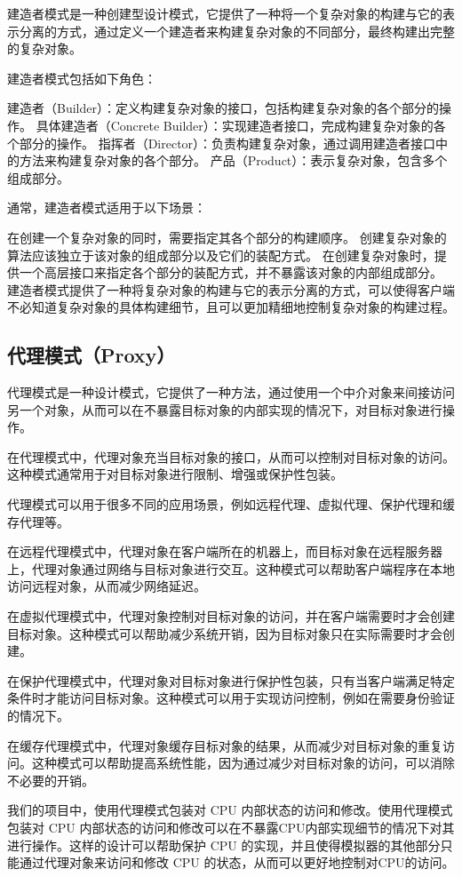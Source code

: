 \documentclass[cn,black,12pt,normal]{elegantnote}
\begin{document}
建造者模式是一种创建型设计模式，它提供了一种将一个复杂对象的构建与它的表示分离的方式，通过定义一个建造者来构建复杂对象的不同部分，最终构建出完整的复杂对象。

建造者模式包括如下角色：

建造者（Builder）：定义构建复杂对象的接口，包括构建复杂对象的各个部分的操作。
具体建造者（Concrete Builder）：实现建造者接口，完成构建复杂对象的各个部分的操作。
指挥者（Director）：负责构建复杂对象，通过调用建造者接口中的方法来构建复杂对象的各个部分。
产品（Product）：表示复杂对象，包含多个组成部分。

通常，建造者模式适用于以下场景：

在创建一个复杂对象的同时，需要指定其各个部分的构建顺序。
创建复杂对象的算法应该独立于该对象的组成部分以及它们的装配方式。
在创建复杂对象时，提供一个高层接口来指定各个部分的装配方式，并不暴露该对象的内部组成部分。
建造者模式提供了一种将复杂对象的构建与它的表示分离的方式，可以使得客户端不必知道复杂对象的具体构建细节，且可以更加精细地控制复杂对象的构建过程。


\subsection{代理模式（Proxy）}

代理模式是一种设计模式，它提供了一种方法，通过使用一个中介对象来间接访问另一个对象，从而可以在不暴露目标对象的内部实现的情况下，对目标对象进行操作。

在代理模式中，代理对象充当目标对象的接口，从而可以控制对目标对象的访问。这种模式通常用于对目标对象进行限制、增强或保护性包装。

代理模式可以用于很多不同的应用场景，例如远程代理、虚拟代理、保护代理和缓存代理等。

在远程代理模式中，代理对象在客户端所在的机器上，而目标对象在远程服务器上，代理对象通过网络与目标对象进行交互。这种模式可以帮助客户端程序在本地访问远程对象，从而减少网络延迟。

在虚拟代理模式中，代理对象控制对目标对象的访问，并在客户端需要时才会创建目标对象。这种模式可以帮助减少系统开销，因为目标对象只在实际需要时才会创建。

在保护代理模式中，代理对象对目标对象进行保护性包装，只有当客户端满足特定条件时才能访问目标对象。这种模式可以用于实现访问控制，例如在需要身份验证的情况下。

在缓存代理模式中，代理对象缓存目标对象的结果，从而减少对目标对象的重复访问。这种模式可以帮助提高系统性能，因为通过减少对目标对象的访问，可以消除不必要的开销。

我们的项目中，使用代理模式包装对 CPU 内部状态的访问和修改。使用代理模式包装对 CPU 内部状态的访问和修改可以在不暴露CPU内部实现细节的情况下对其进行操作。这样的设计可以帮助保护 CPU 的实现，并且使得模拟器的其他部分只能通过代理对象来访问和修改 CPU 的状态，从而可以更好地控制对CPU的访问。
\end{document}
